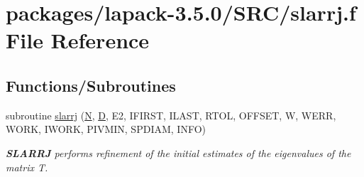\hypertarget{slarrj_8f}{}\section{packages/lapack-\/3.5.0/\+S\+R\+C/slarrj.f File Reference}
\label{slarrj_8f}
\subsection*{Functions/\+Subroutines}
\begin{DoxyCompactItemize}
\item 
subroutine \hyperlink{group__auxOTHERauxiliary_ga86d0ea9b6f2d76876a8f0c0e1a12868c}{slarrj} (\hyperlink{polmisc_8c_a0240ac851181b84ac374872dc5434ee4}{N}, \hyperlink{odrpack_8h_a7dae6ea403d00f3687f24a874e67d139}{D}, E2, I\+F\+I\+R\+S\+T, I\+L\+A\+S\+T, R\+T\+O\+L, O\+F\+F\+S\+E\+T, W, W\+E\+R\+R, W\+O\+R\+K, I\+W\+O\+R\+K, P\+I\+V\+M\+I\+N, S\+P\+D\+I\+A\+M, I\+N\+F\+O)
\begin{DoxyCompactList}\small\item\em {\bfseries S\+L\+A\+R\+R\+J} performs refinement of the initial estimates of the eigenvalues of the matrix T. \end{DoxyCompactList}\end{DoxyCompactItemize}
